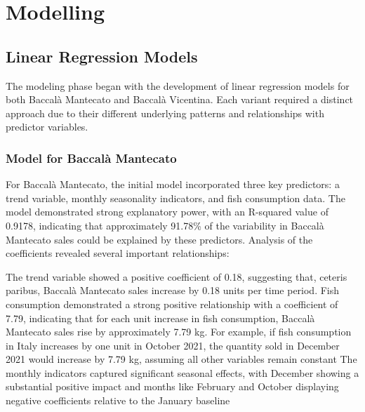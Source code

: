 \documentclass[10pt,twocolumn,letterpaper]{article}
\begin{document}
\section{Modelling}
\subsection{Linear Regression Models}
The modeling phase began with the development of linear regression models for both Baccalà Mantecato and Baccalà Vicentina. Each variant required a distinct approach due to their different underlying patterns and relationships with predictor variables.

\subsubsection{Model for Baccalà Mantecato}
For Baccalà Mantecato, the initial model incorporated three key predictors: a trend variable, monthly seasonality indicators, and fish consumption data. The model demonstrated strong explanatory power, with an R-squared value of 0.9178, indicating that approximately 91.78\% of the variability in Baccalà Mantecato sales could be explained by these predictors.
Analysis of the coefficients revealed several important relationships:

The trend variable showed a positive coefficient of 0.18, suggesting that, ceteris paribus, Baccalà Mantecato sales increase by 0.18 units per time period.
Fish consumption demonstrated a strong positive relationship with a coefficient of 7.79, indicating that for each unit increase in fish consumption, Baccalà Mantecato sales rise by approximately 7.79 kg. For example, if fish consumption in Italy increases by one unit in October 2021, the quantity sold in December 2021 would increase by 7.79 kg, assuming all other variables remain constant
The monthly indicators captured significant seasonal effects, with December showing a substantial positive impact and months like February and October displaying negative coefficients relative to the January baseline
\end{document}
